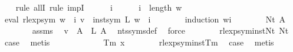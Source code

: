 \begin{isabellebody}
\ \ \isamarkupfalse%
\ {\isacharparenleft}{\kern0pt}rule\ allI{\isacharcomma}{\kern0pt}\ rule\ impI{\isacharparenright}{\kern0pt}\isanewline
\ \ \ \ \isamarkupfalse%
\ i\isanewline
\ \ \ \ \isamarkupfalse%
\ {\isachardoublequoteopen}i\ {\isacharless}{\kern0pt}\ length\ w{\isachardoublequoteclose}\isanewline
\ \ \ \ \isamarkupfalse%
\ \isamarkupfalse%
\ {\isachardoublequoteopen}eval\ {\isacharparenleft}{\kern0pt}rlexp{\isacharunderscore}{\kern0pt}sym\ {\isacharparenleft}{\kern0pt}w\ {\isacharbang}{\kern0pt}\ i{\isacharparenright}{\kern0pt}{\isacharparenright}{\kern0pt}\ v\ {\isacharequal}{\kern0pt}\ inst{\isacharunderscore}{\kern0pt}sym\ L\ {\isacharparenleft}{\kern0pt}w\ {\isacharbang}{\kern0pt}\ i{\isacharparenright}{\kern0pt}{\isachardoublequoteclose}\isanewline
\ \ \ \ \ \ \isamarkupfalse%
\ {\isacharparenleft}{\kern0pt}induction\ {\isachardoublequoteopen}w{\isacharbang}{\kern0pt}i{\isachardoublequoteclose}{\isacharparenright}{\kern0pt}\isanewline
\ \ \ \ \ \ \isamarkupfalse%
\ {\isacharparenleft}{\kern0pt}Nt\ A{\isacharparenright}{\kern0pt}\isanewline
\ \ \ \ \ \ \isamarkupfalse%
\ assms\ \isamarkupfalse%
\ {\isachardoublequoteopen}v\ {\isacharparenleft}{\kern0pt}{\isasymgamma}{\isacharprime}{\kern0pt}\ A{\isacharparenright}{\kern0pt}\ {\isacharequal}{\kern0pt}\ L\ A{\isachardoublequoteclose}\ \isamarkupfalse%
\ nts{\isacharunderscore}{\kern0pt}syms{\isacharunderscore}{\kern0pt}def\ \isamarkupfalse%
\ force\isanewline
\ \ \ \ \ \ \isamarkupfalse%
\ rlexp{\isacharunderscore}{\kern0pt}sym{\isacharunderscore}{\kern0pt}inst{\isacharunderscore}{\kern0pt}Nt\ Nt\ \isamarkupfalse%
\ {\isacharquery}{\kern0pt}case\ \isamarkupfalse%
\ metis\isanewline
\ \ \ \ \isamarkupfalse%
\isanewline
\ \ \ \ \ \ \isamarkupfalse%
\ {\isacharparenleft}{\kern0pt}Tm\ x{\isacharparenright}{\kern0pt}\isanewline
\ \ \ \ \ \ \isamarkupfalse%
\ rlexp{\isacharunderscore}{\kern0pt}sym{\isacharunderscore}{\kern0pt}inst{\isacharunderscore}{\kern0pt}Tm\ \isamarkupfalse%
\ {\isacharquery}{\kern0pt}case\ \isamarkupfalse%
\ metis\isanewline
\ \ \ \ \isamarkupfalse%
\isanewline
\ \ \isamarkupfalse%
\isanewline
\ \ \isamarkupfalse%
\ \isamarkupfalse%

\end{isabellebody}
